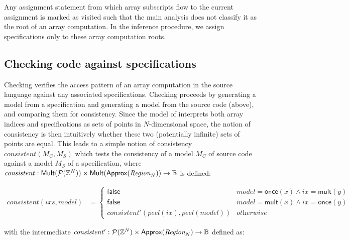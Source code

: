 Any assignment statement from which array subscripts flow to the
current assignment is marked as visited such that the main analysis
does not classify it as the root of an array computation.  In the
inference procedure, we assign specifications only to these array
computation roots.

\subsection{Checking code against specifications}
\label{subsec:checking}

\noindent
Checking verifies the access pattern of an array computation in the
source language against any associated specifications. Checking
proceeds by generating a model from a specification and generating a
model from the source code (above), and comparing them for
consistency.  Since the model of  interprets both
array indices and specifications as sets of points in $N$-dimensional
space, the notion of consistency is then intuitively whether these two
(potentially infinite) sets of points are equal. This leads to a
simple notion of consistency $\mathit{consistent}(M_C, M_S)$ which
tests the consistency of a model $M_C$ of source code against
a model $M_S$ of a specification, where
$\mathit{consistent} :
    \mathsf{Mult}(\mathcal{P}(\textnormal{$\mathbb{Z}$}{}^N)) \times
    \mathsf{Mult}(\mathsf{Approx}(\textnormal{$\textit{Region}_{N}$})) \to \mathbb{B}$ is defined:

\begin{align*}
  \mathit{consistent}(\mathit{ixs}, \mathit{model}) & = \begin{cases}
    \mathsf{false} & \mathit{model} = \mathsf{once}(x) \wedge ix =
    \mathsf{mult}(y) \\
    \mathsf{false} & \mathit{model} = \mathsf{mult}(x) \wedge ix = \mathsf{once}(y) \\
    \mathit{consistent'}(\mathit{peel}(ix), \mathit{peel}(model)) & \textit{otherwise}
  \end{cases}
\end{align*}

with the intermediate
$\mathit{consistent'} : \mathcal{P}(\textnormal{$\mathbb{Z}$}{}^N) \times
\mathsf{Approx}(\textnormal{$\textit{Region}_{N}$}) \to \mathbb{B}$ defined as:

